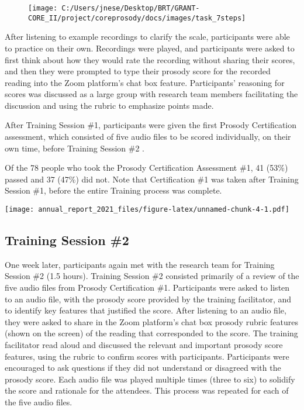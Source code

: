 \documentclass[
]{article}
\begin{document}
\begin{figure}
\texttt{[image: C:/Users/jnese/Desktop/BRT/GRANT-CORE\_II/project/coreprosody/docs/images/task\_7steps]} \end{figure}

After listening to example recordings to clarify the scale, participants
were able to practice on their own. Recordings were played, and
participants were asked to first think about how they would rate the
recording without sharing their scores, and then they were prompted to
type their prosody score for the recorded reading into the Zoom
platform's chat box feature. Participants' reasoning for scores was
discussed as a large group with research team members facilitating the
discussion and using the rubric to emphasize points made.

After Training Session \#1, participants were given the first Prosody
Certification assessment, which consisted of five audio files to be
scored individually, on their own time, before Training Session \#2 .

Of the 78 people who took the Prosody Certification Assessment \#1, 41
(53\%) passed and 37 (47\%) did not. Note that Certification \#1 was
taken after Training Session \#1, before the entire Training process was
complete.

\texttt{[image: annual\_report\_2021\_files/figure-latex/unnamed-chunk-4-1.pdf]}

\hypertarget{training-session-2}{%
\subsection{Training Session \#2}\label{training-session-2}}

One week later, participants again met with the research team for
Training Session \#2 (1.5 hours). Training Session \#2 consisted
primarily of a review of the five audio files from Prosody Certification
\#1. Participants were asked to listen to an audio file, with the
prosody score provided by the training facilitator, and to identify key
features that justified the score. After listening to an audio file,
they were asked to share in the Zoom platform's chat box prosody rubric
features (shown on the screen) of the reading that corresponded to the
score. The training facilitator read aloud and discussed the relevant
and important prosody score features, using the rubric to confirm scores
with participants. Participants were encouraged to ask questions if they
did not understand or disagreed with the prosody score. Each audio file
was played multiple times (three to six) to solidify the score and
rationale for the attendees. This process was repeated for each of the
five audio files.
\end{document}

